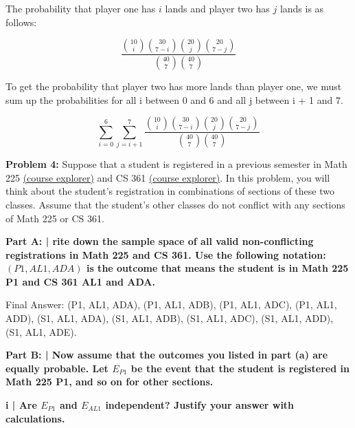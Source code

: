 \documentclass{article}
\begin{document}
 The probability that player one has $i$ lands and player two has $j$ lands is as follows:
 
 \begin{displaymath}
 \frac{{10 \choose i}{30 \choose 7-i}{20 \choose j}{20 \choose 7-j}}{{40 \choose 7}{40 \choose 7}}
 \end{displaymath}
 
 To get the probability that player two has more lands than player one, we must sum up the probabilities for all i between 0 and 6 and all j between i + 1 and 7.
 
 \begin{displaymath}
 \sum_{i=0}^{6}\sum_{j=i+1}^{7}\frac{{10 \choose i}{30 \choose 7-i}{20 \choose j}{20 \choose 7-j}}{{40 \choose 7}{40 \choose 7}}
 \end{displaymath}
 
 \newpage
 
 \begin{center}
      \Large\textbf{Problem 4:} Suppose that a student is registered in a previous semester in Math 225 \href{https://courses.illinois.edu/schedule/2019/spring/MATH/225}{(course explorer)} and CS 361 \href{https://courses.illinois.edu/schedule/2019/spring/CS/361}{(course explorer)}. In this problem, you will think about the student's registration in combinations of sections of these two classes. Assume that the student's other classes do not conflict with any sections of Math 225 or CS 361.\par
 \end{center}

 \textbf{Part A: | rite down the sample space of all valid non-conflicting registrations in Math 225 and CS 361. Use the following notation: $(P1, AL1, ADA)$ is the outcome that means the student is in Math 225 P1 and CS 361 AL1 and ADA.}\newline
 
 Final Answer: {(P1, AL1, ADA), (P1, AL1, ADB), (P1, AL1, ADC), (P1, AL1, ADD), (S1, AL1, ADA), (S1, AL1, ADB), (S1, AL1, ADC), (S1, AL1, ADD), (S1, AL1, ADE)}.\newline
 
 \textbf{Part B: | Now assume that the outcomes you listed in part (a) are equally probable. Let $E_{P1}$ be the event that the student is registered in Math 225 P1, and so on for other sections.}\newline
 
 \textbf{i | Are $E_{P1}$ and $E_{AL1}$ independent? Justify your answer with calculations.}\newline
 
\end{document}
